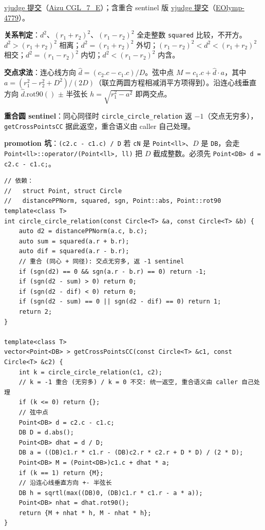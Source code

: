 		\href{https://vjudge.net/solution/69929473}{vjudge 提交}（\href{https://vjudge.net/problem/Aizu-CGL_7_E}{Aizu CGL\_7\_E}）；含重合 sentinel 版 \href{https://vjudge.net/solution/69929406}{vjudge 提交}（\href{https://vjudge.net/problem/EOlymp-4779}{EOlymp-4779}）。

		\textbf{关系判定}：$d^2$、$(r_1 + r_2)^2$、$(r_1 - r_2)^2$ 全走整数 \texttt{squared} 比较，不开方。$d^2 > (r_1 + r_2)^2$ 相离；$d^2 = (r_1 + r_2)^2$ 外切；$(r_1 - r_2)^2 < d^2 < (r_1 + r_2)^2$ 相交；$d^2 = (r_1 - r_2)^2$ 内切；$d^2 < (r_1 - r_2)^2$ 内含。

		\textbf{交点求法}：连心线方向 $\hat{d} = (c_2.c - c_1.c) / D$。弦中点 $M = c_1.c + \hat{d} \cdot a$，其中 $a = (r_1^2 - r_2^2 + D^2) / (2 D)$（联立两圆方程相减消平方项得到）。沿连心线垂直方向 $\hat{d}.\mathrm{rot90}()$ $\pm$ 半弦长 $h = \sqrt{r_1^2 - a^2}$ 即两交点。

		\textbf{重合圆 sentinel}：同心同径时 \texttt{circle\_circle\_relation} 返 $-1$（交点无穷多），\texttt{getCrossPointsCC} 据此返空，重合语义由 caller 自己处理。

		\textbf{promotion 坑}：\texttt{(c2.c - c1.c) / D} 若 \texttt{cN} 是 \texttt{Point<ll>}、$D$ 是 \texttt{DB}，会走 \texttt{Point<ll>::operator/(Point<ll>, ll)} 把 $D$ 截成整数。必须先 \texttt{Point<DB> d = c2.c - c1.c;}。

		\begin{verbatim}
// 依赖：
//   struct Point, struct Circle
//   distancePPNorm, squared, sgn, Point::abs, Point::rot90
template<class T>
int circle_circle_relation(const Circle<T> &a, const Circle<T> &b) {
	auto d2 = distancePPNorm(a.c, b.c);
	auto sum = squared(a.r + b.r);
	auto dif = squared(a.r - b.r);
	// 重合 (同心 + 同径): 交点无穷多, 返 -1 sentinel
	if (sgn(d2) == 0 && sgn(a.r - b.r) == 0) return -1;
	if (sgn(d2 - sum) > 0) return 0;
	if (sgn(d2 - dif) < 0) return 0;
	if (sgn(d2 - sum) == 0 || sgn(d2 - dif) == 0) return 1;
	return 2;
}

template<class T>
vector<Point<DB> > getCrossPointsCC(const Circle<T> &c1, const Circle<T> &c2) {
	int k = circle_circle_relation(c1, c2);
	// k = -1 重合 (无穷多) / k = 0 不交: 统一返空, 重合语义由 caller 自己处理
	if (k <= 0) return {};
	// 弦中点
	Point<DB> d = c2.c - c1.c;
	DB D = d.abs();
	Point<DB> dhat = d / D;
	DB a = ((DB)c1.r * c1.r - (DB)c2.r * c2.r + D * D) / (2 * D);
	Point<DB> M = (Point<DB>)c1.c + dhat * a;
	if (k == 1) return {M};
	// 沿连心线垂直方向 +- 半弦长
	DB h = sqrtl(max((DB)0, (DB)c1.r * c1.r - a * a));
	Point<DB> nhat = dhat.rot90();
	return {M + nhat * h, M - nhat * h};
}
		\end{verbatim}


